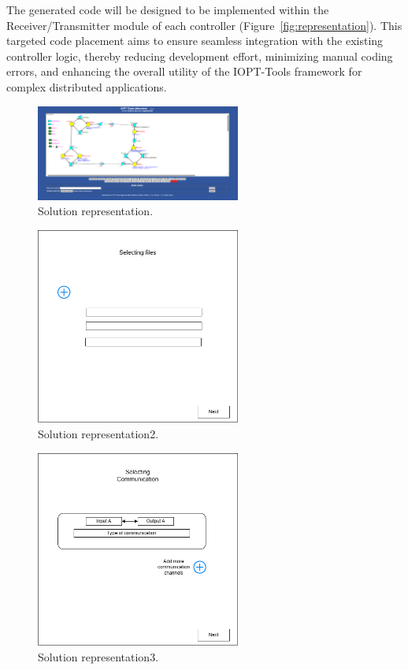  
The generated code will be designed to be implemented within the Receiver/Transmitter module of each controller (Figure~\ref{fig:representation}). This targeted code placement aims to ensure seamless integration with the existing controller logic, thereby reducing development effort, minimizing manual coding errors, and enhancing the overall utility of the IOPT-Tools framework for complex distributed applications.



\begin{figure}[htbp]
  \centering
  \includegraphics[width=0.6\textwidth]{Chapters/Figures/butao.png}
  \caption{Solution representation.}
  \label{fig:butao}
\end{figure}

\begin{figure}[htbp]
  \centering
  \includegraphics[width=0.6\textwidth]{Chapters/Figures/11.png}
  \caption{Solution representation2.}
  \label{fig:11}
\end{figure}

\begin{figure}[htbp]
  \centering
  \includegraphics[width=0.6\textwidth]{Chapters/Figures/12.png}
  \caption{Solution representation3.}
  \label{fig:12}
\end{figure}
 
